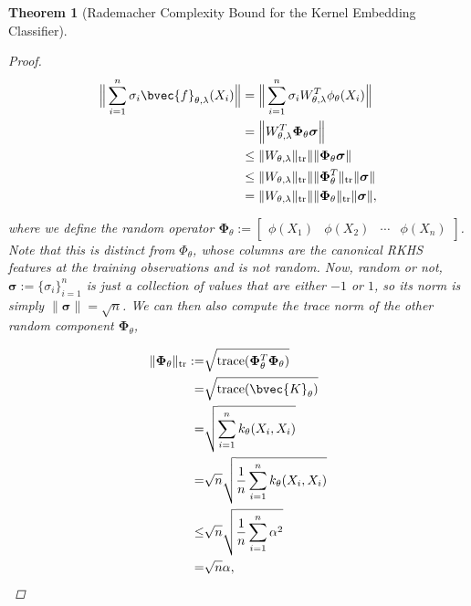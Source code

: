 \documentclass{article}
\newtheorem{theorem}{Theorem}[section]
\begin{document}
\begin{theorem}[Rademacher Complexity Bound for the Kernel Embedding Classifier]
\begin{proof}
				\begin{equation}
					\begin{aligned}
						\Big\| \sum_{i = 1}^{n} \sigma_{i}\bvec{f}_{\theta, \lambda}(X_{i}) \Big\| &= \Big\| \sum_{i = 1}^{n} \sigma_{i} W_{\theta, \lambda}^{T} \phi_{\theta}(X_{i}) \Big\| \\
						&= \Big\| W_{\theta, \lambda}^{T} \bm{\Phi}_{\theta} \bm{\sigma} \Big\| \\
						&\leq \| W_{\theta, \lambda} \|_{\mathrm{tr}} \| \| \bm{\Phi}_{\theta} \bm{\sigma} \| \\
						&\leq \| W_{\theta, \lambda} \|_{\mathrm{tr}} \| \| \bm{\Phi}_{\theta}^{T} \|_{\mathrm{tr}} \| \bm{\sigma} \| \\
						&= \| W_{\theta, \lambda} \|_{\mathrm{tr}} \| \| \bm{\Phi}_{\theta} \|_{\mathrm{tr}} \| \bm{\sigma} \|,
					\end{aligned}
				\end{equation}
				
				where we define the random operator $\bm{\Phi}_{\theta} := \begin{bmatrix} \phi(X_{1}) & \phi(X_{2}) & \cdots & \phi(X_{n}) \end{bmatrix}$. Note that this is distinct from $\Phi_{\theta}$, whose columns are the canonical RKHS features at the training observations and is not random. Now, random or not, $\bm{\sigma} := \{\sigma_{i}\}_{i = 1}^{n}$ is just a collection of values that are either $-1$ or $1$, so its norm is simply $\| \bm{\sigma} \| = \sqrt{n}$. We can then also compute the trace norm of the other random component $\bm{\Phi}_{\theta}$,
				
				\begin{equation}
					\begin{aligned}
						\| \bm{\Phi}_{\theta} \|_{\mathrm{tr}} :=& \sqrt{\mathrm{trace}(\bm{\Phi}_{\theta}^{T} \bm{\Phi}_{\theta})} \\
						=& \sqrt{\mathrm{trace}(\bvec{K}_{\theta})} \\
						=& \sqrt{\sum_{i = 1}^{n} k_{\theta}(X_{i}, X_{i})} \\
						=& \sqrt{n} \sqrt{ \frac{1}{n} \sum_{i = 1}^{n} k_{\theta}(X_{i}, X_{i})} \\
						\leq& \sqrt{n} \sqrt{ \frac{1}{n} \sum_{i = 1}^{n} \alpha^{2}} \\
						=& \sqrt{n} \alpha,
					\end{aligned}
				\end{equation}
				

\end{proof}
\end{theorem}
\end{document}
